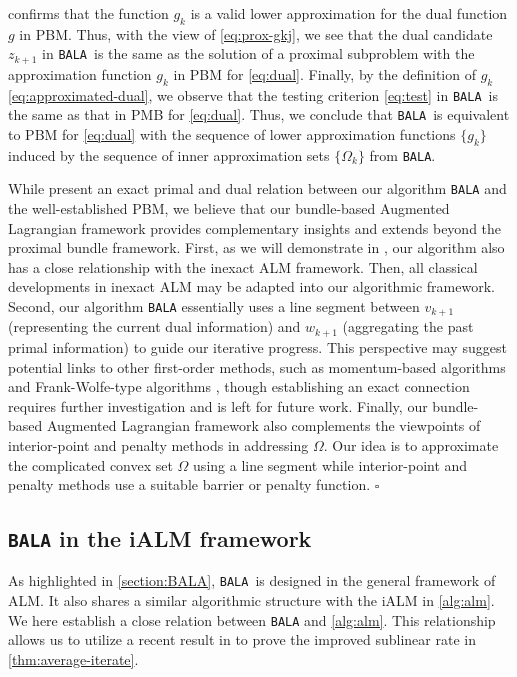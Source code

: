 \documentclass[11pt]{article}
\newcommand{\alg}{\texttt{BALA}}%
\begin{document}
 confirms that the function $g_{k}$ is a valid lower approximation for the dual function $g$ in PBM. Thus, with the view of \eqref{eq:prox-gkj}, we see that the dual candidate $z_{k+1}$ in \alg~is the same as the solution of a proximal subproblem with the approximation function $g_{k}$ in PBM for \eqref{eq:dual}. 
%
Finally, by the definition of $g_k$ \eqref{eq:approximated-dual}, we observe that the testing criterion \eqref{eq:test} in \alg~is the same as that in PMB for \eqref{eq:dual}. Thus, we conclude that \alg~is equivalent to PBM for \eqref{eq:dual} with the sequence of lower approximation functions $\{g_k\}$ induced by the sequence of inner approximation sets $\{\Omega_k\}$ from \alg. 

\vspace{2mm}

\begin{remark}
    While  present an exact primal and dual relation between our algorithm \alg{} and the well-established PBM,  we believe that our bundle-based Augmented Lagrangian framework provides complementary insights and extends beyond the proximal bundle framework. First, as we will demonstrate in ,  our algorithm also has a close relationship with the inexact ALM framework. Then, all classical developments in inexact ALM may be adapted into our algorithmic framework. Second, our algorithm \alg{} essentially uses a line segment between $v_{k+1}$ (representing the current dual information) and $w_{k+1}$ (aggregating the past primal information) to guide our iterative progress. This perspective may suggest potential links to other first-order methods, such as momentum-based algorithms \cite{nesterov2013gradient} and Frank-Wolfe-type algorithms \cite{frank1956algorithm,jaggi2013revisiting}, though establishing an exact connection requires further investigation and is left for future work. Finally, our bundle-based Augmented Lagrangian framework also complements the viewpoints of interior-point and penalty methods \cite[Chapter 11]{boyd2004convex} in addressing $\Omega$. Our idea is to approximate the complicated convex set $\Omega$ using a line segment while interior-point and penalty methods use a suitable barrier or penalty function. \hfill $\square$
\end{remark}

\subsection{\alg{} in the iALM framework}
\label{subsection:AALM-iALM}
As highlighted in \cref{section:BALA}, \alg~is designed in the general framework of ALM. It also shares a similar algorithmic structure with the iALM in \cref{alg:alm}. We here establish a close relation between \alg{} and \cref{alg:alm}. This relationship allows us to utilize a recent result in \cite{xu2021iteration} to prove the improved sublinear rate in \cref{thm:average-iterate}. 
\end{document}
